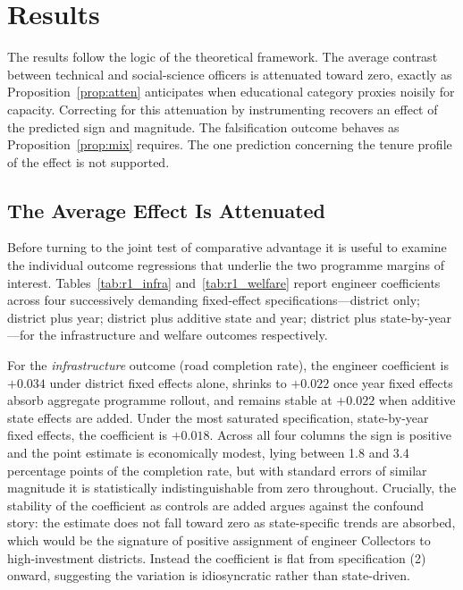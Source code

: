 
\section{Results}
\label{sec:results}

The results follow the logic of the theoretical framework. The average contrast between
technical and social-science officers is attenuated toward zero, exactly as
Proposition~\ref{prop:atten} anticipates when educational category proxies noisily for
capacity. Correcting for this attenuation by instrumenting recovers an effect of the
predicted sign and magnitude. The falsification outcome behaves as
Proposition~\ref{prop:mix} requires. The one prediction concerning the tenure profile
of the effect is not supported.

\subsection{The Average Effect Is Attenuated}
\label{sec:results-ols}

Before turning to the joint test of comparative advantage it is useful to examine the
individual outcome regressions that underlie the two programme margins of interest.
Tables~\ref{tab:r1_infra} and~\ref{tab:r1_welfare} report engineer coefficients across
four successively demanding fixed-effect specifications---district only; district plus
year; district plus additive state and year; district plus state-by-year---for the
infrastructure and welfare outcomes respectively.

For the \emph{infrastructure} outcome (road completion rate), the engineer coefficient
is $+0.034$ under district fixed effects alone, shrinks to $+0.022$ once year fixed
effects absorb aggregate programme rollout, and remains stable at $+0.022$ when
additive state effects are added. Under the most saturated specification, state-by-year
fixed effects, the coefficient is $+0.018$. Across all four columns the sign is positive
and the point estimate is economically modest, lying between 1.8 and 3.4 percentage
points of the completion rate, but with standard errors of similar magnitude it is
statistically indistinguishable from zero throughout. Crucially, the stability of the
coefficient as controls are added argues against the confound story: the estimate does
not fall toward zero as state-specific trends are absorbed, which would be the signature
of positive assignment of engineer Collectors to high-investment districts. Instead the
coefficient is flat from specification (2) onward, suggesting the variation is
idiosyncratic rather than state-driven.


